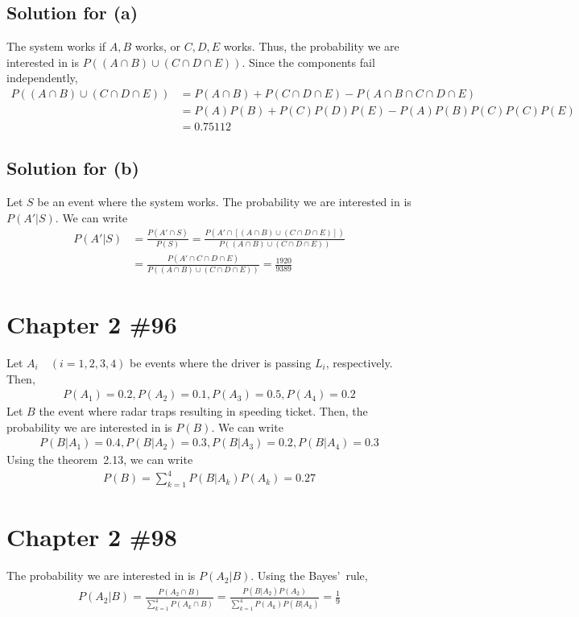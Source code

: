 \documentclass{scrartcl}
\begin{document}
\subsection{Solution for (a)}
The system works if \(A, B\) works, or \(C, D, E\) works. Thus, the probability
we are interested in is \(P((A \cap B) \cup (C \cap D \cap E))\). Since the
components fail independently,
\begin{align*}
  P((A \cap B) \cup (C \cap D \cap E))
  &= P(A \cap B) + P(C \cap D \cap E) - P(A \cap B \cap C \cap D \cap E) \\
  &= P(A)P(B) + P(C)P(D)P(E) - P(A)P(B)P(C)P(C)P(E) \\
  &= 0.75112
\end{align*}

\subsection{Solution for (b)}
Let \(S\) be an event where the system works. The probability we are interested
in is \(P(A' | S)\). We can write
\begin{align*}
  P(A' | S)
  &= \frac{P(A' \cap S)}{P(S)}
  = \frac{P(A' \cap [(A \cap B) \cup (C \cap D \cap E)])}{P((A \cap B) \cup (C \cap D \cap E))} \\
  &= \frac{P(A' \cap C \cap D \cap E)}{P((A \cap B) \cup (C \cap D \cap E))}
  = \frac{1920}{9389}
\end{align*}

\section{Chapter 2 \#96}
Let \(A_i \quad (i = 1, 2, 3, 4)\) be events where the driver is passing
\(L_i\), respectively. Then,
\begin{align*}
  P(A_1) = 0.2, P(A_2) = 0.1, P(A_3) = 0.5, P(A_4) = 0.2
\end{align*}
Let \(B\) the event where radar traps resulting in speeding ticket. Then, the
probability we are interested in is \(P(B)\). We can write
\begin{align*}
  P(B | A_1) = 0.4, P(B | A_2) = 0.3, P(B | A_3) = 0.2, P(B | A_4) = 0.3
\end{align*}
Using the theorem~2.13, we can write
\begin{align*}
  P(B) = \sum^4_{k = 1} P(B | A_k) P(A_k) = 0.27
\end{align*}

\section{Chapter 2 \#98}
The probability we are interested in is \(P(A_2 | B)\). Using the Bayes'~rule,
\begin{align*}
  P(A_2 | B)
  = \frac{P(A_2 \cap B)}{\sum^4_{k = 1} P(A_k \cap B)}
  = \frac{P(B | A_2) P(A_2)}{\sum^4_{k = 1} P(A_k) P(B | A_k)}
  = \frac{1}{9}
\end{align*}
\end{document}
